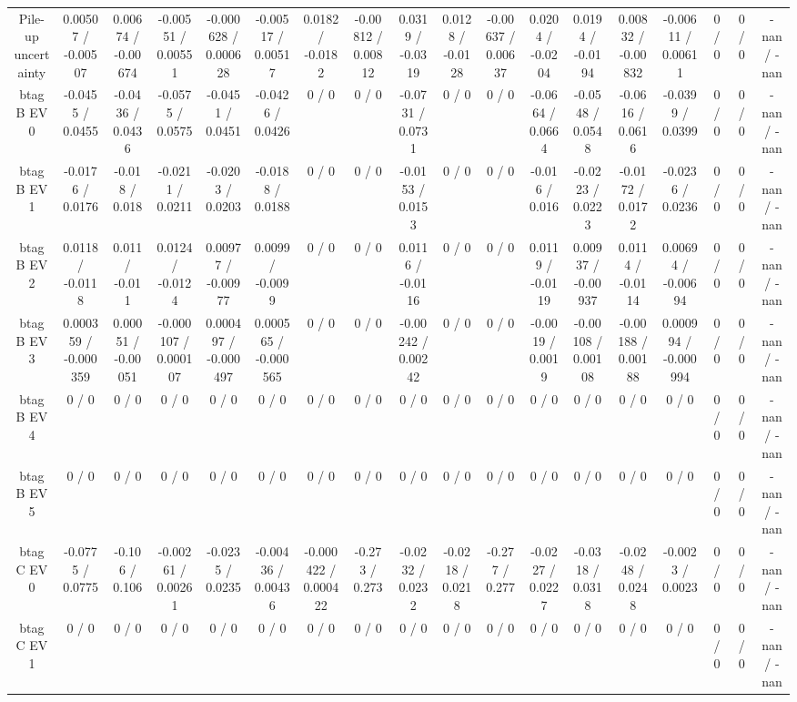 \documentclass[10pt]{article}
\begin{document}
\begin{table}[htbp]
\begin{center}
\begin{tabular}{|c|c|c|c|c|c|c|c|c|c|c|c|c|c|c|c|c|c|}
  Pile-up uncertainty & 0.00507 / -0.00507 & 0.00674 / -0.00674 & -0.00551 / 0.00551 & -0.000628 / 0.000628 & -0.00517 / 0.00517 & 0.0182 / -0.0182 & -0.00812 / 0.00812 & 0.0319 / -0.0319 & 0.0128 / -0.0128 & -0.00637 / 0.00637 & 0.0204 / -0.0204 & 0.0194 / -0.0194 & 0.00832 / -0.00832 & -0.00611 / 0.00611 & 0 / 0 & 0 / 0 & -nan / -nan \\ 
  btag B EV 0 & -0.0455 / 0.0455 & -0.0436 / 0.0436 & -0.0575 / 0.0575 & -0.0451 / 0.0451 & -0.0426 / 0.0426 & 0 / 0 & 0 / 0 & -0.0731 / 0.0731 & 0 / 0 & 0 / 0 & -0.0664 / 0.0664 & -0.0548 / 0.0548 & -0.0616 / 0.0616 & -0.0399 / 0.0399 & 0 / 0 & 0 / 0 & -nan / -nan \\ 
  btag B EV 1 & -0.0176 / 0.0176 & -0.018 / 0.018 & -0.0211 / 0.0211 & -0.0203 / 0.0203 & -0.0188 / 0.0188 & 0 / 0 & 0 / 0 & -0.0153 / 0.0153 & 0 / 0 & 0 / 0 & -0.016 / 0.016 & -0.0223 / 0.0223 & -0.0172 / 0.0172 & -0.0236 / 0.0236 & 0 / 0 & 0 / 0 & -nan / -nan \\ 
  btag B EV 2 & 0.0118 / -0.0118 & 0.011 / -0.011 & 0.0124 / -0.0124 & 0.00977 / -0.00977 & 0.0099 / -0.0099 & 0 / 0 & 0 / 0 & 0.0116 / -0.0116 & 0 / 0 & 0 / 0 & 0.0119 / -0.0119 & 0.00937 / -0.00937 & 0.0114 / -0.0114 & 0.00694 / -0.00694 & 0 / 0 & 0 / 0 & -nan / -nan \\ 
  btag B EV 3 & 0.000359 / -0.000359 & 0.00051 / -0.00051 & -0.000107 / 0.000107 & 0.000497 / -0.000497 & 0.000565 / -0.000565 & 0 / 0 & 0 / 0 & -0.00242 / 0.00242 & 0 / 0 & 0 / 0 & -0.0019 / 0.0019 & -0.00108 / 0.00108 & -0.00188 / 0.00188 & 0.000994 / -0.000994 & 0 / 0 & 0 / 0 & -nan / -nan \\ 
  btag B EV 4 & 0 / 0 & 0 / 0 & 0 / 0 & 0 / 0 & 0 / 0 & 0 / 0 & 0 / 0 & 0 / 0 & 0 / 0 & 0 / 0 & 0 / 0 & 0 / 0 & 0 / 0 & 0 / 0 & 0 / 0 & 0 / 0 & -nan / -nan \\ 
  btag B EV 5 & 0 / 0 & 0 / 0 & 0 / 0 & 0 / 0 & 0 / 0 & 0 / 0 & 0 / 0 & 0 / 0 & 0 / 0 & 0 / 0 & 0 / 0 & 0 / 0 & 0 / 0 & 0 / 0 & 0 / 0 & 0 / 0 & -nan / -nan \\ 
  btag C EV 0 & -0.0775 / 0.0775 & -0.106 / 0.106 & -0.00261 / 0.00261 & -0.0235 / 0.0235 & -0.00436 / 0.00436 & -0.000422 / 0.000422 & -0.273 / 0.273 & -0.0232 / 0.0232 & -0.0218 / 0.0218 & -0.277 / 0.277 & -0.0227 / 0.0227 & -0.0318 / 0.0318 & -0.0248 / 0.0248 & -0.0023 / 0.0023 & 0 / 0 & 0 / 0 & -nan / -nan \\ 
  btag C EV 1 & 0 / 0 & 0 / 0 & 0 / 0 & 0 / 0 & 0 / 0 & 0 / 0 & 0 / 0 & 0 / 0 & 0 / 0 & 0 / 0 & 0 / 0 & 0 / 0 & 0 / 0 & 0 / 0 & 0 / 0 & 0 / 0 & -nan / -nan \\ 

\end{tabular}
\end{center}
\end{table}
\end{document}
